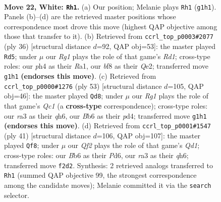 \documentclass[11pt]{article}
\begin{document}
\clearpage

\begin{figure}[p]\centering
\begin{subfigure}{0.46\textwidth}\centering
\resizebox{\linewidth}{!}{%
\newchessgame
\chessboard[
  setfen={5b1r/1p1kpp1n/1B1p2p1/1b6/3PP2p/rP2RP2/P4QPP/2K3R1 w - - 2 22},
  showmover=false,
  pgfstyle=straightmove, color=movearrow, markmove={g1-h1}
]}
\caption{}
\end{subfigure}\hfill
\begin{subfigure}{0.46\textwidth}\centering
\resizebox{\linewidth}{!}{%
\newchessgame
\chessboard[
  setfen={r3kbr1/1pp4p/p1n2p2/2p5/2N1P3/5PBq/PP2QP1P/R2R3K w q - 7 19},
  showmover=false,
  pgfstyle=straightmove, color=movearrow, markmove={d1-d5}
]}
\caption{}
\end{subfigure}
\\[4pt]
\begin{subfigure}{0.46\textwidth}\centering
\resizebox{\linewidth}{!}{%
\newchessgame
\chessboard[
  setfen={2q3k1/2p2p2/pp2r1pQ/3p4/PP1Pb1P1/2P4P/1R3P2/5BK1 b - - 0 27},
  showmover=false,
  pgfstyle=straightmove, color=movearrow, markmove={c8-d8}
]}
\caption{}
\end{subfigure}\hfill
\begin{subfigure}{0.46\textwidth}\centering
\resizebox{\linewidth}{!}{%
\newchessgame
\chessboard[
  setfen={r2q2kr/ppp4p/3p2pQ/4nb2/2P4P/2N2P2/PP4P1/R3KB1R b - - 0 21},
  showmover=false,
  pgfstyle=straightmove, color=movearrow, markmove={d8-f8}
]}
\caption{}
\end{subfigure}
\caption{\textbf{Move 22, White: \texttt{Rh1}.} (a) Our position; Melanie plays \texttt{Rh1} (\texttt{g1h1}). Panels (b)--(d) are the retrieved master positions whose correspondence most drove this move (highest QAP objective among those that transfer to it). (b) Retrieved from \texttt{ccrl\_top\_p0003\#2077} (ply 36) [structural distance $d$=92, QAP obj=53]: the master played \texttt{Rd5}; under $\mu$ our \emph{Rg1} plays the role of that game's \emph{Rd1}; cross-type roles: our \emph{p}h4 as their \emph{R}a1, our \emph{b}f8 as their \emph{Q}e2; transferred move \texttt{g1h1} \textbf{(endorses this move)}. (c) Retrieved from \texttt{ccrl\_top\_p0000\#1276} (ply 53) [structural distance $d$=105, QAP obj=46]: the master played \texttt{Qd8}; under $\mu$ our \emph{Rg1} plays the role of that game's \emph{Qc1} (a \textbf{cross-type} correspondence); cross-type roles: our \emph{r}a3 as their \emph{q}h6, our \emph{B}b6 as their \emph{p}d4; transferred move \texttt{g1h1} \textbf{(endorses this move)}. (d) Retrieved from \texttt{ccrl\_top\_p0001\#1547} (ply 41) [structural distance $d$=106, QAP obj=107]: the master played \texttt{Qf8}; under $\mu$ our \emph{Qf2} plays the role of that game's \emph{Qd1}; cross-type roles: our \emph{B}b6 as their \emph{P}d6, our \emph{r}a3 as their \emph{q}h6; transferred move \texttt{f2d2}. Synthesis: 2 retrieved analogs transferred to \texttt{Rh1} (summed QAP objective 99, the strongest correspondence among the candidate moves); Melanie committed it via the \texttt{search} selector.}
\label{fig:thought-m42}
\end{figure}
\end{document}
